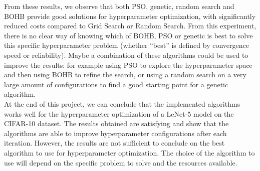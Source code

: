 \documentclass[a4 paper,11pt,2]{article}
\begin{document}
From these results, we observe that both PSO, genetic, random search and BOHB
provide good solutions for hyperparameter optimization, with significantly
reduced costs compared to Grid Search or Random Search. From this experiment,
there is no clear way of knowing which of BOHB, PSO or genetic is best to solve
this specific hyperparameter problem (whether ``best'' is defined by
convergence speed or reliability). Maybe a combination of these algorithms
could be used to improve the results: for example using PSO to explore the
hyperparameter space and then using BOHB to refine the search, or using a
random search on a very large amount of configurations to find a good starting
point for a genetic algorithm.\\

At the end of this project, we can conclude that the implemented algorithms
works well for the hyperparameter optimization of a LeNet-5 model on the
CIFAR-10 dataset. The results obtained are satisfying and show that the
algorithms are able to improve hyperparameter configurations after each
iteration. However, the results are not sufficient to conclude on the best
algorithm to use for hyperparameter optimization. The choice of the algorithm
to use will depend on the specific problem to solve and the resources
available.

\printbibliography
\end{document}
